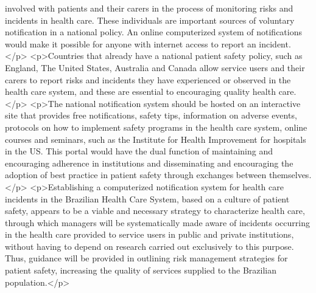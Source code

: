             involved with patients and their carers in the process of monitoring risks and incidents
            in health care. These individuals are important sources of voluntary notification in a
            national policy. An online computerized system of notifications would make it possible
            for anyone with internet access to report an incident.</p>
          <p>Countries that already have a national patient safety policy, such as England, The
            United States, Australia and Canada allow service users and their carers to report risks
            and incidents they have experienced or observed in the health care system, and these are
            essential to encouraging quality health care.</p>
          <p>The national notification system should be hosted on an interactive site that provides
            free notifications, safety tips, information on adverse events, protocols on how to
            implement safety programs in the health care system, online courses and seminars, such
            as the Institute for Health Improvement for hospitals in the US. This portal would have
            the dual function of maintaining and encouraging adherence in institutions and
            disseminating and encouraging the adoption of best practice in patient safety through
            exchanges between themselves.</p>
          <p>Establishing a computerized notification system for health care incidents in the
            Brazilian Health Care System, based on a culture of patient safety, appears to be a
            viable and necessary strategy to characterize health care, through which managers will
            be systematically made aware of incidents occurring in the health care provided to
            service users in public and private institutions, without having to depend on research
            carried out exclusively to this purpose. Thus, guidance will be provided in outlining
            risk management strategies for patient safety, increasing the quality of services
            supplied to the Brazilian population.</p>

